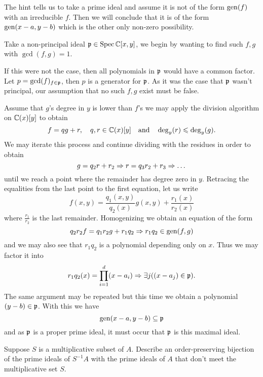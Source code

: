 \documentclass[12pt]{memoir}
\begin{document}
The hint tells us to take a prime ideal and assume it is not of the form $\operatorname{gen}(f)$ with an irreducible $f$. Then we will conclude that it is of the form $\operatorname{gen}(x-a,y-b)$ which is the other only non-zero possibility.
\begin{ptcbr}
Take a non-principal ideal $\mathfrak{p}\in\operatorname{Spec}\mathbb{C}[x,y]$, we begin by wanting to find such $f,g$ with $\gcd(f,g)=1$.\par
If this were not the case, then all polynomials in $\mathfrak{p}$ would have a common factor. Let $p=\gcd(f)_{f\in\mathfrak{p}}$, then $p$ is a generator for $\mathfrak{p}$. As it was the case that $\mathfrak{p}$ wasn't principal, our assumption that no such $f,g$ exist must be false.\par 
Assume that $g$'s degree in $y$ is lower than $f$'s we may apply the division algorithm on $\bC(x)[y]$ to obtain 
$$f=qg+r,\quad q,r\in \mathbb{C}(x)[y]\quad\text{and}\quad\deg_y(r)\leqslant\deg_y(g).$$
We may iterate this process and continue dividing with the residues in order to obtain 
$$g=q_2r+r_2\Rightarrow r=q_3r_2+r_3\Rightarrow\dots$$
until we reach a point where the remainder has degree zero in $y$. Retracing the equalities from the last point to the first equation, let us write 
$$f(x,y)=\frac{q_1(x,y)}{q_2(x)}g(x,y)+\frac{r_1(x)}{r_2(x)}$$
where $\frac{r_1}{r_2}$ is the last remainder. Homogenizing we obtain an equation of the form 
$$q_2r_2f=q_1r_2g+r_1q_2\Rightarrow r_1q_2\in\operatorname{gen}(f,g)$$
and we may also see that $r_1q_2$ is a polynomial depending only on $x$. Thus we may factor it into 
$$r_1q_2(x)=\prod_{i=1}^d(x-a_i)\Rightarrow \exists j((x-a_j)\in\mathfrak{p}).$$
The same argument may be repeated but this time we obtain a polynomial $(y-b)\in\mathfrak{p}$. With this we have 
$$\operatorname{gen}(x-a,y-b)\subseteq\mathfrak{p}$$
and as $\mathfrak{p}$ is a proper prime ideal, it must occur that $\mathfrak{p}$ is this maximal ideal.
\iffalse
Now, we know that $f,g$ are coprime in $C[x,y]$, we now want to show that they are coprime in $\bC(x)[y]$. Assume that
 $$h\in\bC(x)[y]\word{with}h\mid f,\ h\mid g,$$
then 
$$h(x,y)=\frac{p_0(x)}{q_0(x)}+\frac{p_1(x)y}{q_1(x)}+\dots+\frac{p_n(x)y^n}{q_n(x)}.$$
If we take $q=q_0q_1\dots q_n$ then $qh\in\bC[x,y]$ and 
$$qh\mid qf,\word{and}qh\mid qg\word{in}\bC(x)[y].$$
\fi
\end{ptcbr}
    
\begin{Ej}[3.2.K Vakil]
    Suppose $S$ is a multiplicative subset of $A$. Describe an order-preserving bijection of the prime ideals of $S^{-1}A$ with the prime ideals of $A$ that don't meet the multiplicative set $S$.
\end{Ej}
\end{document}
